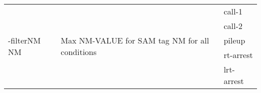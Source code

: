 {\small
\begin{tabular}{@{}p{}p{}l@{}}
\multirow{5}{=}{-filterNM NM} & \multirow{5}{=}{Max NM-VALUE for SAM tag NM for all conditions} & call-1 \\
 &  & call-2 \\
 &  & pileup \\
 &  & rt-arrest \\
 &  & lrt-arrest \\
\end{tabular}\\
}
